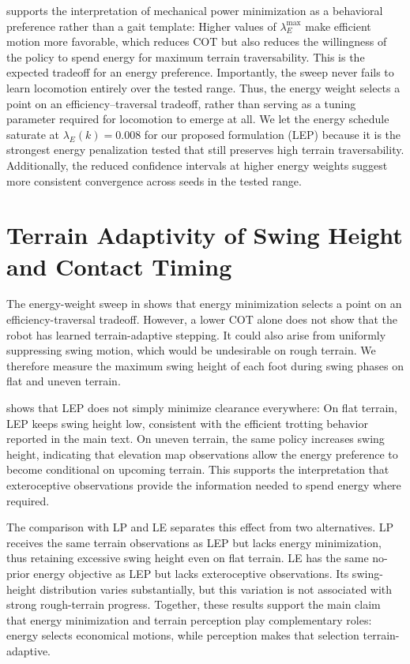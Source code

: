 \documentclass{article}
\newcommand{\baselineTwo}{LP}
\newcommand{\baselineFour}{LEP}
\newcommand{\baselineFourBlind}{LE}
\begin{document}
     supports the interpretation of mechanical power minimization as a behavioral preference rather than a gait template: Higher values of \(\lambda_E^{\max}\) make efficient motion more favorable, which reduces COT but also reduces the willingness of the policy to spend energy for maximum terrain traversability. This is the expected tradeoff for an energy preference. Importantly, the sweep never fails to learn locomotion entirely over the tested range. Thus, the energy weight selects a point on an efficiency--traversal tradeoff, rather than serving as a tuning parameter required for locomotion to emerge at all. We let the energy schedule saturate at \(\lambda_E(k) = 0.008\) for our proposed formulation (\baselineFour{}) because it is the strongest energy penalization tested that still preserves high terrain traversability. Additionally, the reduced confidence intervals at higher energy weights suggest more consistent convergence across seeds in the tested range.

    \section{Terrain Adaptivity of Swing Height and Contact Timing}
    \label{app:step-height-adaptivity}
    
    The energy-weight sweep in  shows that energy minimization selects a point on an efficiency-traversal tradeoff. However, a lower COT alone does not show that the robot has learned terrain-adaptive stepping. It could also arise from uniformly suppressing swing motion, which would be undesirable on rough terrain. We therefore measure the maximum swing height of each foot during swing phases on flat and uneven terrain.
    
     shows that \baselineFour{} does not simply minimize clearance everywhere:
    On flat terrain, \baselineFour{} keeps swing height low, consistent with the efficient trotting behavior reported in the main text. On uneven terrain, the same policy increases swing height, indicating that elevation map observations allow the energy preference to become conditional on upcoming terrain. 
    This supports the interpretation that exteroceptive observations provide the information needed to spend energy where required.
    
    The comparison with \baselineTwo{} and \baselineFourBlind{} separates this effect from two alternatives. \baselineTwo{} receives the same terrain observations as \baselineFour{} but lacks energy minimization, thus retaining excessive swing height even on flat terrain. \baselineFourBlind{} has the same no-prior energy objective as \baselineFour{} but lacks exteroceptive observations. Its swing-height distribution varies substantially, but this variation is not associated with strong rough-terrain progress. Together, these results support the main claim that energy minimization and terrain perception play complementary roles: energy selects economical motions, while perception makes that selection terrain-adaptive.
    
\end{document}
